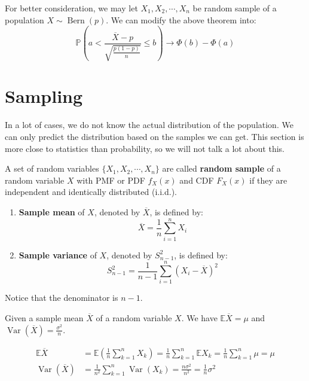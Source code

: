 \documentclass{huhtakm-template-book}
\newcommand{\prob}{\mathbb{P}}
\newcommand{\expect}{\mathbb{E}}
\DeclareMathOperator{\Bern}{Bern}
\DeclareMathOperator{\Var}{Var}
\begin{document}
\begin{rem}
	For better consideration, we may let $X_{1},X_{2},\cdots,X_{n}$ be random sample of a population $X\sim\Bern(p)$. We can modify the above theorem into:
	\begin{equation*}
		\prob\left(a<\frac{\overline{X}-p}{\sqrt{\frac{p(1-p)}{n}}}\leq b\right)\to\Phi(b)-\Phi(a)
	\end{equation*}
\end{rem}
\section{Sampling}
In a lot of cases, we do not know the actual distribution of the population. We can only predict the distribution based on the samples we can get. This section is more close to statistics than probability, so we will not talk a lot about this.
\begin{defn}
	A set of random variables $\{X_{1},X_{2},\cdots,X_{n}\}$ are called \textbf{random sample} of a random variable $X$ with PMF or PDF $f_{X}(x)$ and CDF $F_{X}(x)$ if they are independent and identically distributed (i.i.d.).
	\begin{enumerate}
		\item \textbf{Sample mean} of $X$, denoted by $\overline{X}$, is defined by:
		\begin{equation*}
			\overline{X}=\frac{1}{n}\sum_{i=1}^{n}X_{i}
		\end{equation*}
		\item \textbf{Sample variance} of $X$, denoted by $S_{n-1}^{2}$, is defined by:
		\begin{equation*}
			S_{n-1}^{2}=\frac{1}{n-1}\sum_{i=1}^{n}(X_{i}-\overline{X})^{2}
		\end{equation*}
	\end{enumerate}
\end{defn}
\begin{rem}
	Notice that the denominator is $n-1$.
\end{rem}
\begin{thm}
	\label{Chapter 7 (Theorem) Expectation and variance of sample mean}
	Given a sample mean $\overline{X}$ of a random variable $X$. We have $\expect{\overline{X}}=\mu$ and $\Var(\overline{X})=\frac{\sigma^{2}}{n}$.
\end{thm}
\begin{proofing}
	\begin{align*}
		\expect{\overline{X}}&=\expect\left(\frac{1}{n}\sum_{k=1}^{n}X_{k}\right)=\frac{1}{n}\sum_{k=1}^{n}\expect{X_{k}}=\frac{1}{n}\sum_{k=1}^{n}\mu=\mu\\
		\Var(\overline{X})&=\frac{1}{n^{2}}\sum_{k=1}^{n}\Var(X_{k})=\frac{n\sigma^{2}}{n^{2}}=\frac{1}{n}\sigma^{2}
	\end{align*}
\end{proofing}
\end{document}
